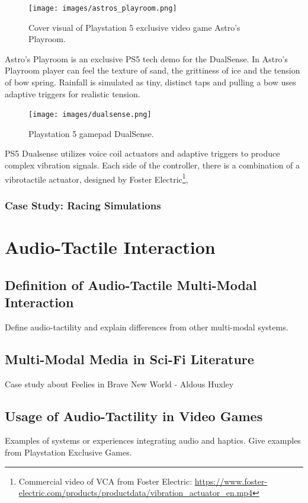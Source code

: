                 \begin{figure}[H]
                    \centering
                    \texttt{[image: images/astros\_playroom.png]}
                    \caption{Cover visual of Playstation 5 exclusive video game Astro's Playroom.}
                    \label{fig:ASTROS}
                \end{figure}

                Astro's Playroom is an exclusive PS5 tech demo for the DualSense. In Astro's Playroom player can feel the texture of sand, the grittiness of ice and the tension of bow spring. Rainfall is simulated as tiny, distinct taps and pulling a bow uses adaptive triggers for realistic tension.

                \begin{figure}[H]
                    \centering
                    \texttt{[image: images/dualsense.png]}
                    \caption{Playstation 5 gamepad DualSense.}
                    \label{fig:DUALSENSE}
                \end{figure}

                PS5 Dualsense utilizes voice coil actuators and adaptive triggers to produce complex vibration signals\cite{What_is_under_Dualsense}. Each side of the controller, there is a combination of a vibrotactile actuator, designed by Foster Electric\footnote{Commercial video of VCA from Foster Electric: \url{https://www.foster-electric.com/products/productdata/vibration_actuator_en.mp4}}, 
            \subsubsection{Case Study: Racing Simulations}
    \section{Audio-Tactile Interaction}
        \subsection{Definition of Audio-Tactile Multi-Modal Interaction} Define audio-tactility and explain differences from other multi-modal systems.
        \subsection{Multi-Modal Media in Sci-Fi Literature} Case study about Feelies in Brave New World - Aldous Huxley 
        \subsection{Usage of Audio-Tactility in Video Games} Examples of systems or experiences integrating audio and haptics. Give examples from Playstation Exclusive Games.